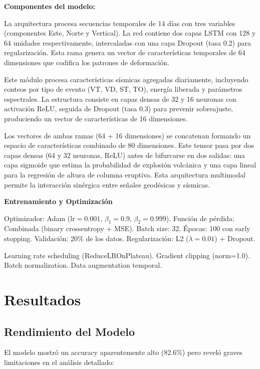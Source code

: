 \documentclass[11pt, a4paper, twocolumn]{article}  %
\begin{document}
\textbf{Componentes del modelo:}

La arquitectura procesa secuencias temporales de 14 días con tres variables (componentes Este, Norte y Vertical). La red contiene dos capas LSTM con 128 y 64 unidades respectivamente, intercaladas con una capa Dropout (tasa 0.2) para regularización. Esta rama genera un vector de características temporales de 64 dimensiones que codifica los patrones de deformación.

Este módulo procesa características sísmicas agregadas diariamente, incluyendo conteos por tipo de evento (VT, VD, ST, TO), energía liberada y parámetros espectrales. La estructura consiste en capas densas de 32 y 16 neuronas con activación ReLU, seguida de Dropout (tasa 0.3) para prevenir sobreajuste, produciendo un vector de características de 16 dimensiones.

Los vectores de ambas ramas (64 + 16 dimensiones) se concatenan formando un espacio de características combinado de 80 dimensiones. Este tensor pasa por dos capas densas (64 y 32 neuronas, ReLU) antes de bifurcarse en dos salidas: una capa sigmoide que estima la probabilidad de explosión volcánica y una capa lineal para la regresión de altura de columna eruptiva. Esta arquitectura multimodal permite la interacción sinérgica entre señales geodésicas y sísmicas.

\textbf{Entrenamiento y Optimización}

Optimizador: Adam ($\text{lr}=0.001$, $\beta_1=0.9$, $\beta_2=0.999$).
Función de pérdida: Combinada (binary crossentropy + MSE).
Batch size: 32.
Épocas: 100 con early stopping.
Validación: 20\% de los datos.
Regularización: L2 ($\lambda=0.01$) + Dropout.

Learning rate scheduling (ReduceLROnPlateau).
Gradient clipping (norm=1.0).
Batch normalization.
Data augmentation temporal.

\section{Resultados}

\subsection{Rendimiento del Modelo}

El modelo mostró un accuracy aparentemente alto (82.6\%) pero reveló graves limitaciones en el análisis detallado:
\end{document}
